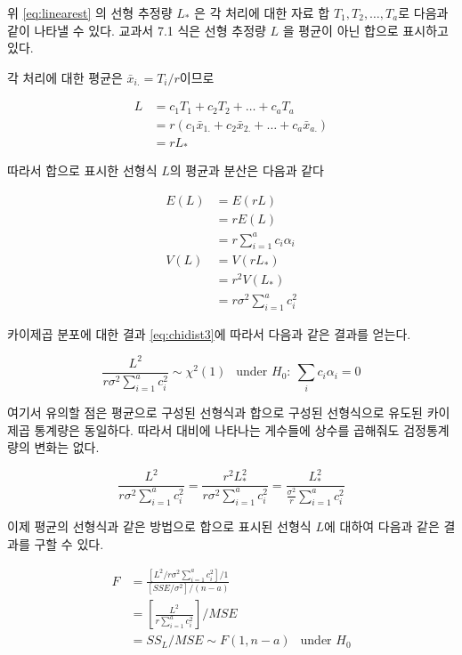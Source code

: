 \documentclass[
]{book}
\begin{document}
위 \eqref{eq:linearest} 의 선형 추정량 \(L_*\) 은 각 처리에 대한 자료 합 \(T_1, T_2, \dots , T_a\)로 다음과 같이 나타낼 수 있다. 교과서 7.1 식은 선형 추정량 \(L\) 을 평균이 아닌 합으로 표시하고 있다.

각 처리에 대한 평균은 \(\bar x_{i.} = T_i / r\)이므로

\begin{align*}
L  & = c_1 T_1 + c_2 T_2 + \dots + c_a T_a  \\
  & = r( c_1 \bar x_{1.} + c_2 \bar x_{2.} + \dots + c_a \bar x_{a.} ) \\
  & =r L_*
\end{align*}

따라서 합으로 표시한 선형식 \(L\)의 평균과 분산은 다음과 같다

\begin{align*}
E(L) & =  E(rL) \\
   & = r E(L) \\
   & = r \sum_{i=1}^a c_i \alpha_i \\
V(L) & = V(rL_*) \\
   & = r^2 V(L_*) \\
   & = r \sigma^2 \sum_{i=1}^a c_i^2
\end{align*}

카이제곱 분포에 대한 결과 \eqref{eq:chidist3}에 따라서 다음과 같은 결과를 얻는다.

\begin{equation}
\frac{L^2}{r\sigma^2  \sum_{i=1}^a c_i^2 } \sim \chi^2(1) ~~\text{ under } H_0: ~  \sum_i c_i \alpha_i =0
\label{eq:lineardistnulltotal}
\end{equation}

여기서 유의할 점은 평균으로 구성된 선형식과 합으로 구성된 선형식으로 유도된 카이제곱 통계량은 동일하다.
따라서 대비에 나타나는 게수들에 상수를 곱해줘도 검정통계량의 변화는 없다.

\[ \frac{L^2}{ r\sigma^2  \sum_{i=1}^a c_i^2}  = \frac{r^2 L_*^2}{r\sigma^2  \sum_{i=1}^a c_i^2 } = \frac{L_*^2}{\tfrac{\sigma^2}{r} \sum_{i=1}^a c_i^2 } \]

이제 평균의 선형식과 같은 방법으로 합으로 표시된 선형식 \(L\)에 대하여 다음과 같은 결과를 구할 수 있다.

\begin{align*}
F & = \frac{  \left [ L^2 / r \sigma^2 \sum_{i=1}^a c_i^2 \right ] /1} { \left [ SSE/ \sigma^2  \right ] / (n-a)} \\
& =  \left[ \frac{L^2}{r \sum_{i=1}^a c_i^2 } \right ] / MSE  \\
& = SS_L / MSE \sim F(1, n-a) ~~\text{ under } H_0
\end{align*}
\end{document}

